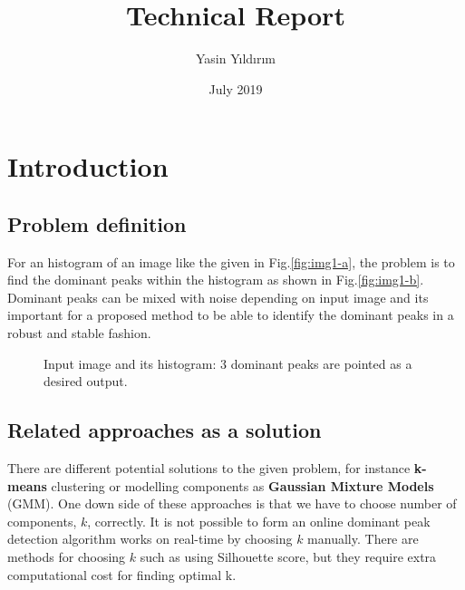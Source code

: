 \documentclass[12pt]{extarticle}
\title{Technical Report}
\author{Yasin Yıldırım}
\date{July 2019}
\begin{document}
\maketitle

\section{Introduction}
\subsection{Problem definition}
For an histogram of an image like the given in Fig.\ref{fig:img1-a}, the problem is to find the dominant peaks within the histogram as shown in Fig.\ref{fig:img1-b}. Dominant peaks can be mixed with noise depending on input image and its important for a proposed method to be able to identify the dominant peaks in a robust and stable fashion.

\begin{figure}
\centering     %
{}
\hspace{0.5mm}
\caption{Input image and its histogram: 3 dominant peaks are pointed as a desired output.}
 \label{fig:img1}
\end{figure}

\subsection{Related approaches as a solution}
There are different potential solutions to the given problem, for instance \textbf{k-means} clustering or modelling components as \textbf{Gaussian Mixture Models} (GMM). One down side of these approaches is that we have to choose number of components, $k$, correctly. It is not possible to form an online dominant peak detection algorithm works on real-time by choosing $k$ manually. There are methods for choosing $k$ such as using Silhouette score, but they require extra computational cost for finding optimal k.
\end{document}
